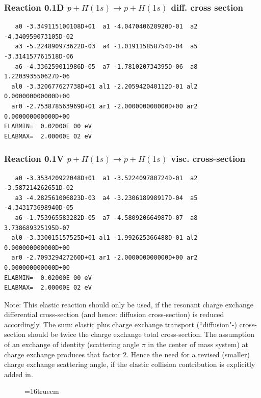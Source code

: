 \documentclass[12pt,dvips]{article}
\begin{document}
\subsubsection{
Reaction 0.1D    $ p + H (1s) \rightarrow p + H (1s)$  diff. cross
section}


\begin{small}\begin{verbatim}
   a0 -3.349115100108D+01  a1 -4.047040620920D-01  a2 -4.340959073105D-02
   a3 -5.224890973622D-03  a4 -1.019115858754D-04  a5 -3.314157761518D-06
   a6 -4.336259011986D-05  a7 -1.781020734395D-06  a8  1.220393550627D-06
  al0 -3.320677627738D+01 al1 -2.205942040112D-01 al2  0.000000000000D+00
  ar0 -2.753878563969D+01 ar1 -2.000000000000D+00 ar2  0.000000000000D+00
ELABMIN=  0.02000E 00 eV
ELABMAX=  2.00000E 02 eV
\end{verbatim}\end{small}


\subsubsection{
Reaction 0.1V    $p + H (1s) \rightarrow p + H (1s)$ visc. cross-section
}



\begin{small}\begin{verbatim}
   a0 -3.353420922048D+01  a1 -3.522409780724D-01  a2 -3.587214262651D-02
   a3 -4.282561006823D-03  a4 -3.230618998917D-04  a5 -4.343173698940D-05
   a6 -1.753965583282D-05  a7 -4.580920664987D-07  a8  3.738689325195D-07
  al0 -3.330015157525D+01 al1 -1.992625366488D-01 al2  0.000000000000D+00
  ar0 -2.709329427260D+01 ar1 -2.000000000000D+00 ar2  0.000000000000D+00
ELABMIN=  0.02000E 00 eV
ELABMAX=  2.00000E 02 eV
\end{verbatim}\end{small}
Note: This elastic reaction should only be used, if the resonant charge
exchange differential cross-section (and hence: diffusion cross-section)
is reduced accordingly. The sum: elastic plus charge exchange transport
(``diffusion"-) cross-section should be twice the charge exchange total
cross-section. The assumption of an exchange of identity (scattering
angle $\pi$ in the center of mass system) at charge exchange produces
that factor 2. Hence the need for a revised (smaller) charge exchange
scattering angle, if the elastic collision contribution is explicitly
added in.

\begin{figure} \label{0.1}
\epsfxsize=16truecm
\end{figure}
\newpage
\end{document}
